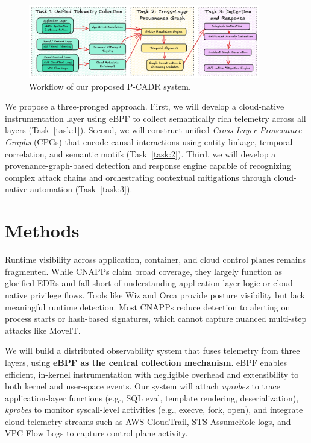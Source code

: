 \begin{figure}[t!]
    \centering \includegraphics[width=0.90\textwidth]{fig/arch.png}
    \caption{Workflow of our proposed P-CADR system.}
    \label{fig:arch}
    \end{figure}

We propose a three-pronged approach. First, we will develop a cloud-native instrumentation layer using eBPF to collect semantically rich telemetry across all layers (Task~\ref{task:1}). Second, we will construct unified \emph{Cross-Layer Provenance Graphs} (CPGs) that encode causal interactions using entity linkage, temporal correlation, and semantic motifs (Task~\ref{task:2}). Third, we will develop a provenance-graph-based detection and response engine capable of recognizing complex attack chains and orchestrating contextual mitigations through cloud-native automation (Task~\ref{task:3}).

\section*{Methods}


Runtime visibility across application, container, and cloud control planes remains fragmented. While CNAPPs claim broad coverage, they largely function as glorified EDRs and fall short of understanding application-layer logic or cloud-native privilege flows. Tools like Wiz and Orca provide posture visibility but lack meaningful runtime detection. Most CNAPPs reduce detection to alerting on process starts or hash-based signatures, which cannot capture nuanced multi-step attacks like MoveIT.

We will build a distributed observability system that fuses telemetry from three layers, using \textbf{eBPF as the central collection mechanism}. eBPF enables efficient, in-kernel instrumentation with negligible overhead and extensibility to both kernel and user-space events. Our system will attach \textit{uprobes} to trace application-layer functions (e.g., SQL eval, template rendering, deserialization), \textit{kprobes} to monitor syscall-level activities (e.g., execve, fork, open), and integrate cloud telemetry streams such as AWS CloudTrail, STS AssumeRole logs, and VPC Flow Logs to capture control plane activity.

